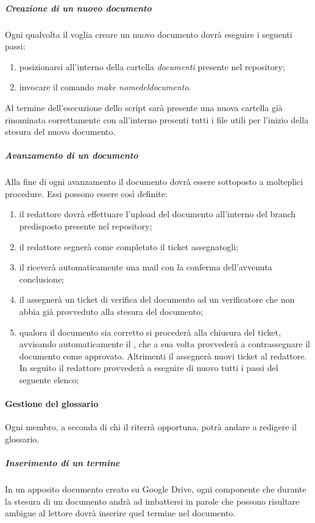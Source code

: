 				\subparagraph{Creazione di un nuovo documento}
				Ogni qualvolta il \roleProjectManager{} voglia creare un nuovo documento dovrà eseguire i seguenti passi:
				\begin{enumerate}
					\item posizionarsi all'interno della cartella \emph{documenti} presente nel repository;
					\item invocare il comando \emph{make nome\textunderscore del\textunderscore documento}.
				\end{enumerate}
				Al termine dell'esecuzione dello script sarà presente una nuova cartella già rinominata correttamente con all'interno presenti tutti i file utili per l'inizio della stesura del nuovo documento.

				\subparagraph{Avanzamento di un documento}
				Alla fine di ogni avanzamento il documento dovrà essere sottoposto a molteplici procedure. Essi possono essere così definite:
				\begin{enumerate}
					\item il redattore dovrà effettuare l'upload del documento all'interno del branch predisposto presente nel repository;
					\item il redattore segnerà come completato il ticket assegnatogli;
					\item il \roleProjectManager{} riceverà automaticamente una mail con la conferma dell'avvenuta conclusione;
					\item il \roleProjectManager{} assegnerà un ticket di verifica del documento ad un verificatore che non abbia già provveduto alla stesura del documento;
					\item qualora il documento sia corretto si procederà alla chiusura del ticket, avvisando automaticamente il \roleProjectManager{}, che a sua volta provvederà a contrassegnare il documento come approvato. Altrimenti il \roleVerifier{} assegnerà nuovi ticket al redattore. In seguito il redattore provvederà a eseguire di nuovo tutti i passi del seguente elenco;
				\end{enumerate}

			\paragraph{Gestione del glossario}
			Ogni membro, a seconda di chi il \roleProjectManager{} riterrà opportuna, potrà andare a redigere il glossario. \\
				\subparagraph{Inserimento di un termine}
				In un apposito documento creato su Google Drive, ogni componente che durante la stesura di un documento andrà ad imbattersi in parole che possono risultare ambigue al lettore dovrà inserire quel termine nel documento.
				
